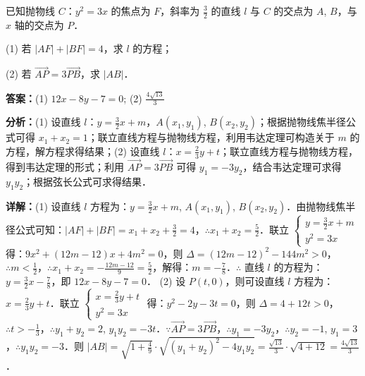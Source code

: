 \begin{question}[points=12]
已知抛物线 $C$：$y^2 = 3x$ 的焦点为 $F$，斜率为 $\frac{3}{2}$ 的直线 $l$ 与 $C$ 的交点为 $A$, $B$，与 $x$ 轴的交点为 $P$．

(1) 若 $|AF| + |BF| = 4$，求 $l$ 的方程；

(2) 若 $\overrightarrow{AP} = 3\overrightarrow{PB}$，求 $|AB|$．
\begin{solution}
\textbf{答案：}(1) $12x - 8y - 7 = 0$; (2) $\frac{4\sqrt{13}}{3}$

\textbf{分析：}(1) 设直线 $l$：$y = \frac{3}{2}x + m$，$A(x_1, y_1)$, $B(x_2, y_2)$；根据抛物线焦半径公式可得 $x_1 + x_2 = 1$；联立直线方程与抛物线方程，利用韦达定理可构造关于 $m$ 的方程，解方程求得结果；(2) 设直线 $l$：$x = \frac{2}{3}y + t$；联立直线方程与抛物线方程，得到韦达定理的形式；利用 $\overrightarrow{AP} = 3\overrightarrow{PB}$ 可得 $y_1 = -3y_2$，结合韦达定理可求得 $y_1y_2$；根据弦长公式可求得结果．

\textbf{详解：}(1) 设直线 $l$ 方程为：$y = \frac{3}{2}x + m$, $A(x_1, y_1)$, $B(x_2, y_2)$．由抛物线焦半径公式可知：$|AF| + |BF| = x_1 + x_2 + \frac{3}{2} = 4$，$\therefore x_1 + x_2 = \frac{5}{2}$．联立 $\begin{cases} y = \frac{3}{2}x + m \\ y^2 = 3x \end{cases}$ 得：$9x^2 + (12m - 12)x + 4m^2 = 0$，则 $\Delta = (12m - 12)^2 - 144m^2 > 0$，$\therefore m < \frac{1}{2}$，$\therefore x_1 + x_2 = -\frac{12m - 12}{9} = \frac{5}{2}$，解得：$m = -\frac{7}{8}$．$\therefore$ 直线 $l$ 的方程为：$y = \frac{3}{2}x - \frac{7}{8}$，即 $12x - 8y - 7 = 0$．
(2) 设 $P(t, 0)$，则可设直线 $l$ 方程为：$x = \frac{2}{3}y + t$．联立 $\begin{cases} x = \frac{2}{3}y + t \\ y^2 = 3x \end{cases}$ 得：$y^2 - 2y - 3t = 0$，则 $\Delta = 4 + 12t > 0$，$\therefore t > -\frac{1}{3}$，$\therefore y_1 + y_2 = 2$, $y_1y_2 = -3t$．$\because \overrightarrow{AP} = 3\overrightarrow{PB}$，$\therefore y_1 = -3y_2$，$\therefore y_2 = -1$, $y_1 = 3$，$\therefore y_1y_2 = -3$．则 $|AB| = \sqrt{1 + \frac{4}{9}} \cdot \sqrt{(y_1 + y_2)^2 - 4y_1y_2} = \frac{\sqrt{13}}{3} \cdot \sqrt{4 + 12} = \frac{4\sqrt{13}}{3}$．
\end{solution}
\end{question}


